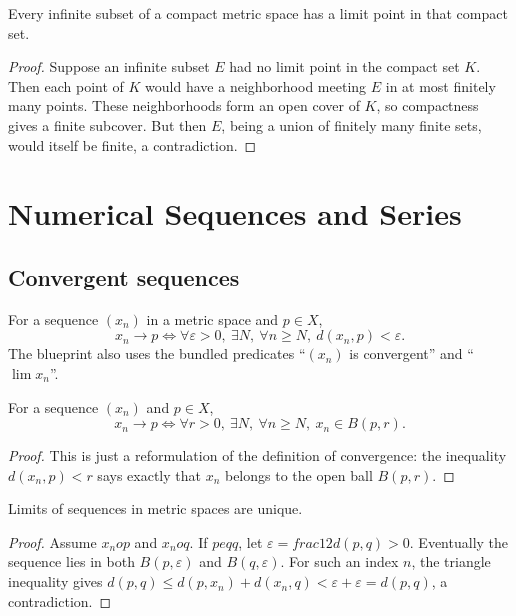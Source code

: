 \begin{theorem}
\label{thm:bolzano-weierstrass}
Every infinite subset of a compact metric space has a limit point in that compact set.
\begin{proof}
Suppose an infinite subset $E$ had no limit point in the compact set $K$. Then each point of
$K$ would have a neighborhood meeting $E$ in at most finitely many points. These neighborhoods
form an open cover of $K$, so compactness gives a finite subcover. But then $E$, being a union
of finitely many finite sets, would itself be finite, a contradiction.
\end{proof}
\end{theorem}

\chapter{Numerical Sequences and Series}

\section{Convergent sequences}

\begin{definition}
\label{def:sequence-convergence}
For a sequence $(x_n)$ in a metric space and $p \in X$,
\[
x_n \to p
\iff
\forall \varepsilon > 0,\ \exists N,\ \forall n \ge N,\ d(x_n,p)<\varepsilon.
\]
The blueprint also uses the bundled predicates ``$(x_n)$ is convergent'' and
``$\lim x_n$''.
\end{definition}

\begin{theorem}
\label{thm:convergence-eventually-ball}
For a sequence $(x_n)$ and $p \in X$,
\[
x_n \to p
\iff
\forall r>0,\ \exists N,\ \forall n \ge N,\ x_n \in B(p,r).
\]
\begin{proof}
This is just a reformulation of the definition of convergence: the inequality
$d(x_n,p)<r$ says exactly that $x_n$ belongs to the open ball $B(p,r)$.
\end{proof}
\end{theorem}

\begin{theorem}
\label{thm:limit-unique}
Limits of sequences in metric spaces are unique.
\begin{proof}
Assume $x_n	o p$ and $x_n	o q$. If $p
eq q$, let $\varepsilon=	frac12 d(p,q)>0$. Eventually the
sequence lies in both $B(p,\varepsilon)$ and $B(q,\varepsilon)$. For such an index $n$, the
triangle inequality gives
$d(p,q)\le d(p,x_n)+d(x_n,q)<\varepsilon+\varepsilon=d(p,q)$, a contradiction.
\end{proof}
\end{theorem}

